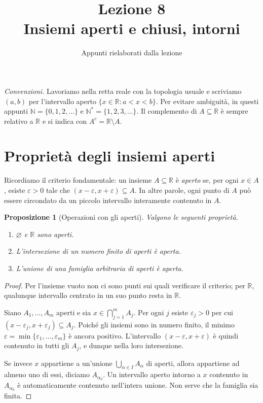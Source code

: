 \documentclass[11pt,a4paper]{article}
\title{Lezione 8\\[.3em]\large Insiemi aperti e chiusi, intorni}
\author{Appunti rielaborati dalla lezione}
\date{}
\newtheorem{proposizione}{Proposizione}[section]
\newcommand{\R}{\mathbb{R}}
\newcommand{\N}{\mathbb{N}}
\begin{document}
\maketitle

\noindent\textit{Convenzioni.} Lavoriamo nella retta reale con la topologia usuale e scriviamo
$(a,b)$ per l'intervallo aperto $\{x\in\R:a<x<b\}$. Per evitare ambiguità,
in questi appunti $\N=\{0,1,2,\ldots\}$ e $\N^*=\{1,2,3,\ldots\}$.
Il complemento di $A\subseteq\R$ è sempre relativo a $\R$ e si indica con
$A^c=\R\setminus A$.

\section{Proprietà degli insiemi aperti}

Ricordiamo il criterio fondamentale: un insieme $A\subseteq\R$ è \emph{aperto}
se, per ogni $x\in A$, esiste $\varepsilon>0$ tale che
$(x-\varepsilon,x+\varepsilon)\subseteq A$. In altre parole, ogni punto di $A$
può essere circondato da un piccolo intervallo interamente contenuto in $A$.

\begin{proposizione}[Operazioni con gli aperti]
Valgono le seguenti proprietà.
\begin{enumerate}
  \item $\varnothing$ e $\R$ sono aperti.
  \item L'intersezione di un numero \emph{finito} di aperti è aperta.
  \item L'unione di una famiglia \emph{arbitraria} di aperti è aperta.
\end{enumerate}
\end{proposizione}

\begin{proof}
Per l'insieme vuoto non ci sono punti sui quali verificare il criterio;
per $\R$, qualunque intervallo centrato in un suo punto resta in $\R$.

Siano $A_1,\ldots,A_m$ aperti e sia $x\in\bigcap_{j=1}^{m}A_j$.
Per ogni $j$ esiste $\varepsilon_j>0$ per cui
$(x-\varepsilon_j,x+\varepsilon_j)\subseteq A_j$.
Poiché gli insiemi sono in numero finito, il minimo
$\varepsilon=\min\{\varepsilon_1,\ldots,\varepsilon_m\}$ è ancora positivo.
L'intervallo $(x-\varepsilon,x+\varepsilon)$ è quindi contenuto in tutti
gli $A_j$, e dunque nella loro intersezione.

Se invece $x$ appartiene a un'unione $\bigcup_{\alpha\in I}A_\alpha$ di aperti,
allora appartiene ad almeno uno di essi, diciamo $A_{\alpha_0}$. Un intervallo
aperto intorno a $x$ contenuto in $A_{\alpha_0}$ è automaticamente contenuto
nell'intera unione. Non serve che la famiglia sia finita.
\end{proof}
\end{document}
